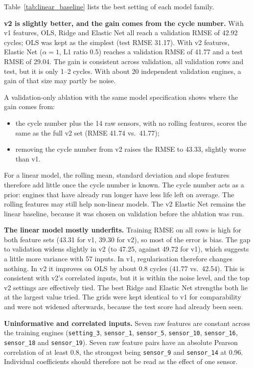 Table~\ref{tab:linear_baseline} lists the best setting of each model family.

\textbf{v2 is slightly better, and the gain comes from the cycle number.}
With v1 features, OLS, Ridge and Elastic Net all reach a validation RMSE of
42.92 cycles; OLS was kept as the simplest (test RMSE 31.17). With v2
features, Elastic Net ($\alpha = 1$, L1 ratio 0.5) reaches a validation RMSE
of 41.77 and a test RMSE of 29.04. The gain is consistent across validation,
all validation rows and test, but it is only 1--2 cycles. With about 20
independent validation engines, a gain of that size may partly be noise.

A validation-only ablation with the same model specification shows where the
gain comes from:
\begin{itemize}
  \item the cycle number plus the 14 raw sensors, with no rolling features,
        scores the same as the full v2 set (RMSE 41.74 vs.\ 41.77);
  \item removing the cycle number from v2 raises the RMSE to 43.33, slightly
        worse than v1.
\end{itemize}
For a linear model, the rolling mean, standard deviation and slope features
therefore add little once the cycle number is known. The cycle number acts as
a prior: engines that have already run longer have less life left on
average. The rolling features may still help non-linear models. The v2
Elastic Net remains the linear baseline, because it was chosen on validation
before the ablation was run.

\textbf{The linear model mostly underfits.} Training RMSE on all rows is high
for both feature sets (43.31 for v1, 39.30 for v2), so most of the error is
bias. The gap to validation widens slightly in v2 (to 47.25, against 49.72
for v1), which suggests a little more variance with 57 inputs. In v1,
regularisation therefore changes nothing. In v2 it improves on OLS by about
0.8 cycles (41.77 vs.\ 42.54). This is consistent with v2's correlated
inputs, but it is within the noise level, and the top v2 settings are
effectively tied. The best Ridge and Elastic Net strengths both lie at the
largest value tried. The grids were kept identical to v1 for comparability
and were not widened afterwards, because the test score had already been
seen.

\textbf{Uninformative and correlated inputs.} Seven raw features are constant
across the training engines (\texttt{setting\_3}, \texttt{sensor\_1},
\texttt{sensor\_5}, \texttt{sensor\_10}, \texttt{sensor\_16},
\texttt{sensor\_18} and \texttt{sensor\_19}). Seven raw feature pairs have an
absolute Pearson correlation of at least 0.8, the strongest being
\texttt{sensor\_9} and \texttt{sensor\_14} at 0.96. Individual coefficients
should therefore not be read as the effect of one sensor.

